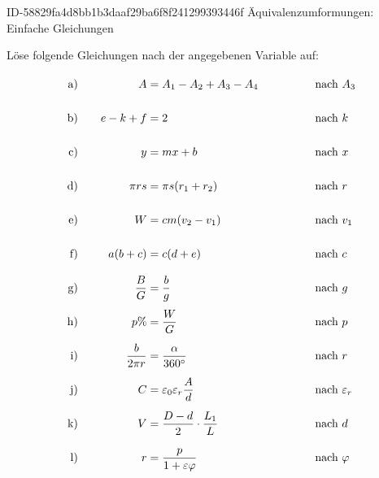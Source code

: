 \begin{exercise}
      {ID-58829fa4d8bb1b3daaf29ba6f8f241299393446f}
      {Äquivalenzumformungen: Einfache Gleichungen}
  \ifproblem\problem\par
    \newcommand{\exnum}[1]{\text{\rule[-2.5ex]{0pt}{6ex}#1}}
    Löse folgende Gleichungen nach der angegebenen Variable auf:
    \allowdisplaybreaks
    \begin{alignat*}{4}
      \exnum{a)}&\quad &                    A&=A_{1}-A_{2}+A_{3}-A_{4}                   & \quad&\quad & \quad&\text{nach $A_{3}$}           \\
      \exnum{b)}&\quad &                e-k+f&=2                                         & \quad&\quad & \quad&\text{nach $k$}               \\
      \exnum{c)}&\quad &                    y&=mx+b                                      & \quad&\quad & \quad&\text{nach $x$}               \\
      \exnum{d)}&\quad &               \pi rs&=\pi s(r_{1}+r_{2})                        & \quad&\quad & \quad&\text{nach $r$}               \\
      \exnum{e)}&\quad &                    W&=cm(v_{2}-v_{1})                           & \quad&\quad & \quad&\text{nach $v_{1}$}           \\
      \exnum{f)}&\quad &               a(b+c)&=c(d+e)                                    & \quad&\quad & \quad&\text{nach $c$}               \\
      \exnum{g)}&\quad &          \frac{B}{G}&=\frac{b}{g}                               & \quad&\quad & \quad&\text{nach $g$}               \\
      \exnum{h)}&\quad &                  p\%&=\frac{W}{G}                               & \quad&\quad & \quad&\text{nach $p$}               \\
      \exnum{i)}&\quad &     \frac{b}{2\pi r}&=\frac{\alpha}{360^{\circ}}                & \quad&\quad & \quad&\text{nach $r$}               \\
      \exnum{j)}&\quad &                    C&=\varepsilon_{0}\varepsilon_{r}\frac{A}{d} & \quad&\quad & \quad&\text{nach $\varepsilon_{r}$} \\
      \exnum{k)}&\quad &                    V&=\frac{D-d}{2}\cdot\frac{L_{1}}{L}         & \quad&\quad & \quad&\text{nach $d$}               \\
      \exnum{l)}&\quad &                    r&=\frac{p}{1+\varepsilon\varphi}            & \quad&\quad & \quad&\text{nach $\varphi$}         \\

\end{alignat*}
\end{exercise}
